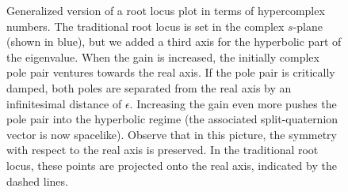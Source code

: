 \begin{figure}[h]
    \centering
    
    \caption{Generalized version of a root locus plot in terms of hypercomplex numbers. The traditional root locus is set in the complex $s$-plane (shown in blue), but we added a third axis for the hyperbolic part of the eigenvalue. When the gain is increased, the initially complex pole pair ventures towards the real axis. If the pole pair is critically damped, both poles are separated from the real axis by an infinitesimal distance of $\epsilon$. Increasing the gain even more pushes the pole pair into the hyperbolic regime (the associated split-quaternion vector is now spacelike). Observe that in this picture, the symmetry with respect to the real axis is preserved. In the traditional root locus, these points are projected onto the real axis, indicated by the dashed lines. }
    \label{fig:root_locus}
\end{figure}

